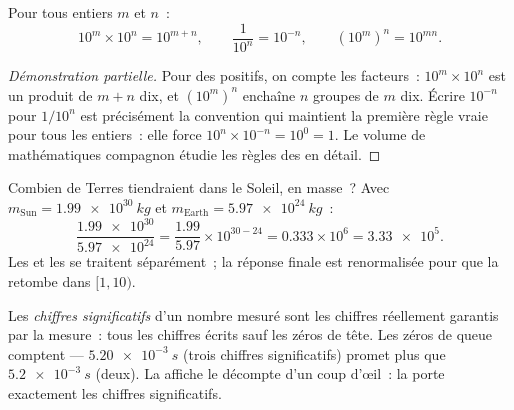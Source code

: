 \begin{proposition}\label{prop:g10:orders-of-magnitude:powers}
Pour tous entiers $m$ et $n$~:
\[
10^{m} \times 10^{n} = 10^{m+n}, \qquad
\frac{1}{10^{n}} = 10^{-n}, \qquad
\left(10^{m}\right)^{n} = 10^{mn}.
\]
\end{proposition}

\begin{proof}[Démonstration partielle]
Pour des  positifs, on compte les facteurs~: $10^{m}
\times 10^{n}$ est un produit de $m + n$ dix, et $(10^m)^n$ enchaîne
$n$ groupes de $m$ dix. Écrire $10^{-n}$ pour $1/10^{n}$ est
précisément la convention qui maintient la première règle vraie pour
tous les entiers~: elle force $10^{n} \times 10^{-n} = 10^{0} = 1$.
Le volume de mathématiques compagnon étudie les règles des 
en détail.
\end{proof}

\begin{example}\label{ex:g10:orders-of-magnitude:scinot}
Combien de Terres tiendraient dans le Soleil, en masse~? Avec
$m_{\text{Sun}} = \qty{1.99e30}{kg}$ et
$m_{\text{Earth}} = \qty{5.97e24}{kg}$~:
\[
\frac{\num{1.99e30}}{\num{5.97e24}}
= \frac{1.99}{5.97} \times 10^{30-24}
= 0.333 \times 10^{6}
= \num{3.33e5}.
\]
Les  et les  se traitent séparément~; la
réponse finale est renormalisée pour que la  retombe dans
$[1, 10)$.
\end{example}

\begin{definition}\label{def:g10:orders-of-magnitude:sigfig}
Les \emph{chiffres significatifs} d'un
nombre mesuré sont les chiffres réellement garantis par la mesure~:
tous les chiffres écrits sauf les zéros de tête. Les zéros de queue
comptent --- $\qty{5.20e-3}{s}$ (trois chiffres significatifs) promet
plus que $\qty{5.2e-3}{s}$ (deux). La  affiche
le décompte d'un coup d'œil~: la  porte exactement les
chiffres significatifs.
\end{definition}

